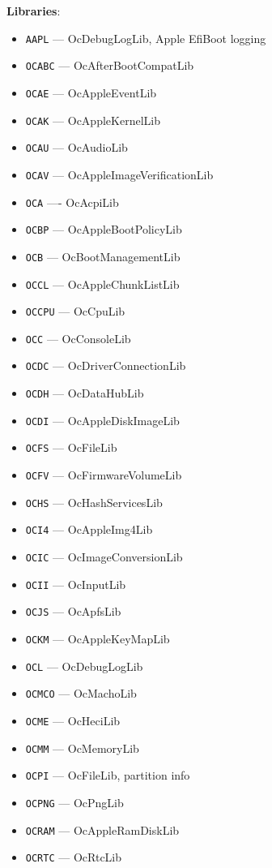 \documentclass[]{article}
\providecommand{\tightlist}{%
  \setlength{\itemsep}{0pt}\setlength{\parskip}{0pt}}
\begin{document}
\begin{enumerate}
  \textbf{Libraries}:
  \begin{itemize}
  \tightlist
  \item \texttt{AAPL} --- OcDebugLogLib, Apple EfiBoot logging
  \item \texttt{OCABC} --- OcAfterBootCompatLib
  \item \texttt{OCAE} --- OcAppleEventLib
  \item \texttt{OCAK} --- OcAppleKernelLib
  \item \texttt{OCAU} --- OcAudioLib
  \item \texttt{OCAV} --- OcAppleImageVerificationLib
  \item \texttt{OCA} ---- OcAcpiLib
  \item \texttt{OCBP} --- OcAppleBootPolicyLib
  \item \texttt{OCB} --- OcBootManagementLib
  \item \texttt{OCCL} --- OcAppleChunkListLib
  \item \texttt{OCCPU} --- OcCpuLib
  \item \texttt{OCC} --- OcConsoleLib
  \item \texttt{OCDC} --- OcDriverConnectionLib
  \item \texttt{OCDH} --- OcDataHubLib
  \item \texttt{OCDI} --- OcAppleDiskImageLib
  \item \texttt{OCFS} --- OcFileLib
  \item \texttt{OCFV} --- OcFirmwareVolumeLib
  \item \texttt{OCHS} --- OcHashServicesLib
  \item \texttt{OCI4} --- OcAppleImg4Lib
  \item \texttt{OCIC} --- OcImageConversionLib
  \item \texttt{OCII} --- OcInputLib
  \item \texttt{OCJS} --- OcApfsLib
  \item \texttt{OCKM} --- OcAppleKeyMapLib
  \item \texttt{OCL} --- OcDebugLogLib
  \item \texttt{OCMCO} --- OcMachoLib
  \item \texttt{OCME} --- OcHeciLib
  \item \texttt{OCMM} --- OcMemoryLib
  \item \texttt{OCPI} --- OcFileLib, partition info
  \item \texttt{OCPNG} --- OcPngLib
  \item \texttt{OCRAM} --- OcAppleRamDiskLib
  \item \texttt{OCRTC} --- OcRtcLib

\end{itemize}
\end{enumerate}
\end{document}

